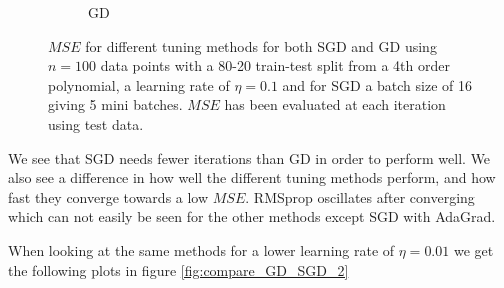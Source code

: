 \documentclass[11pt]{article}
\begin{document}
\begin{figure}[H]
\begin{subfigure}{.5\textwidth}
        \caption{GD}
        \label{fig:}
    \end{subfigure}
    \caption{$MSE$ for different tuning methods for both SGD and GD using $n=100$ data points with a 80-20 train-test split from a 4th order polynomial, a learning rate of $\eta=0.1$ and for SGD a batch size of 16 giving 5 mini batches. $MSE$ has been evaluated at each iteration using test data.}
    \label{fig:compare_GD_SGD}
\end{figure}
We see that SGD needs fewer iterations than GD in order to perform well. We also see a difference in how well the different tuning methods perform, and how fast they converge towards a low $MSE$. RMSprop oscillates after converging which can not easily be seen for the other methods except SGD with AdaGrad.

When looking at the same methods for a lower learning rate of $\eta=0.01$ we get the following plots in figure \ref{fig:compare_GD_SGD_2}
\end{document}
